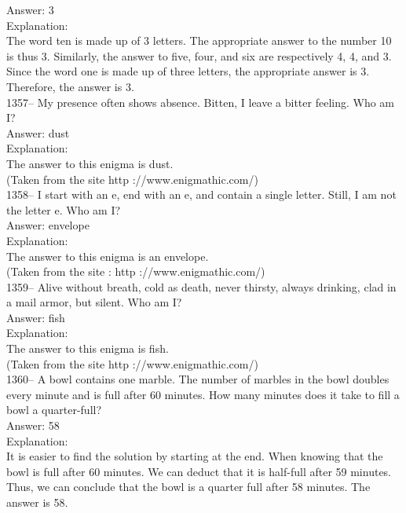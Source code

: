 \documentclass[letterpaper, 12pt]{article}
\begin{document}
Answer: 3\\

Explanation: \\
The word ten is made up of 3 letters. The appropriate answer to the
number 10 is thus 3. Similarly, the answer to five, four, and six
are respectively 4, 4, and 3. Since the word one is made up of three
letters, the appropriate answer is 3.
Therefore, the answer is 3.\\

1357--  My presence often shows absence. Bitten, I leave a bitter feeling. Who am I?\\

Answer: dust\\

Explanation: \\
The answer to this enigma is dust.\\
(Taken from the site http ://www.enigmathic.com/)\\

1358-- I start with an e, end with an e, and contain a single letter. Still, I am not the letter e. Who am I?\\

Answer: envelope\\

Explanation: \\
The answer to this enigma is an envelope.\\
(Taken from the site :  http ://www.enigmathic.com/)\\

1359-- Alive without breath, cold as death, never thirsty, always drinking, clad in a mail armor, but silent. Who am I?\\

Answer: fish\\

Explanation:\\
The answer to this enigma is fish.\\
(Taken from the site http ://www.enigmathic.com/)\\

1360--
A bowl contains one marble. The number of marbles in the bowl doubles every minute and is full after 60 minutes. How many minutes does it take to fill a bowl a quarter-full?\\

Answer: 58\\

Explanation: \\
It is easier to find the solution by starting at the end. When knowing that the bowl is full after 60 minutes. We can deduct that it is half-full after 59 minutes. Thus, we can conclude that the bowl is a quarter full after 58 minutes. The answer is 58.\\
\end{document}
